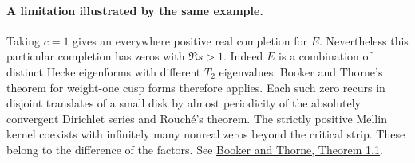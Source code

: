 \paragraph{A limitation illustrated by the same example.}
Taking $c=1$ gives an everywhere positive real completion for $E$. Nevertheless this particular completion has zeros with $\Re s>1$. Indeed $E$ is a combination of distinct Hecke eigenforms with different $T_2$ eigenvalues. Booker and Thorne's theorem for weight-one cusp forms therefore applies. Each such zero recurs in disjoint translates of a small disk by almost periodicity of the absolutely convergent Dirichlet series and Rouch\'e's theorem. The strictly positive Mellin kernel coexists with infinitely many nonreal zeros beyond the critical strip. These belong to the difference of the factors. See \href{https://doi.org/10.2140/ant.2014.8.2027}{Booker and Thorne, Theorem 1.1}.
